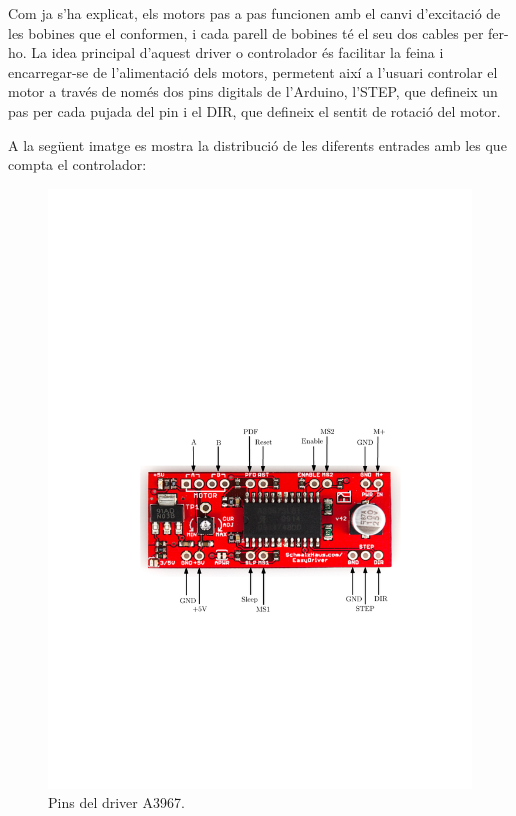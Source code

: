 Com ja s'ha explicat, els motors pas a pas funcionen amb el canvi d'excitació de les bobines que el conformen, i cada parell de bobines té el seu dos cables per fer-ho. La idea principal d'aquest driver o controlador és facilitar la feina i encarregar-se de l'alimentació dels motors, permetent així a l'usuari controlar el motor a través de només dos pins digitals de l'Arduino, l'STEP, que defineix un pas per cada pujada del pin i el DIR, que defineix el sentit de rotació del motor. 


A la següent imatge es mostra la distribució de les diferents entrades amb les que compta el controlador:

\begin{figure}[H]
	\centering
	\includegraphics{driverpins}
	\caption{Pins del driver A3967.}
	\label{fig:PinsA3967}
\end{figure}


